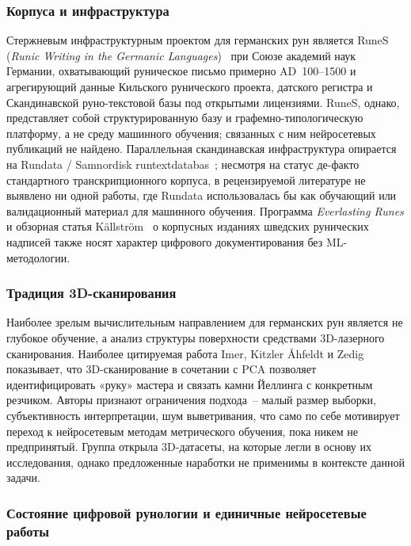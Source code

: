 \documentclass[a4paper,12pt]{extarticle}
\begin{document}
\subsubsection{Корпуса и инфраструктура}

Стержневым инфраструктурным проектом для германских рун является RuneS (\textit{Runic Writing in the Germanic Languages})~\cite{runesdb} при Союзе академий наук Германии, охватывающий руническое письмо примерно AD~100--1500 и агрегирующий данные Кильского рунического проекта, датского регистра и Скандинавской руно-текстовой базы под открытыми лицензиями. RuneS, однако, представляет собой структурированную базу и графемно-типологическую платформу, а не среду машинного обучения; связанных с ним нейросетевых публикаций не найдено. Параллельная скандинавская инфраструктура опирается на Rundata / Samnordisk runtextdatabas~\cite{bianchi_rundata}; несмотря на статус де-факто стандартного транскрипционного корпуса, в рецензируемой литературе не выявлено ни одной работы, где Rundata использовалась бы как обучающий или валидационный материал для машинного обучения. Программа \textit{Everlasting Runes} и обзорная статья Källström~\cite{kallstrom2022} о корпусных изданиях шведских рунических надписей также носят характер цифрового документирования без ML-методологии.

\subsubsection{Традиция 3D-сканирования}

Наиболее зрелым вычислительным направлением для германских рун является не глубокое обучение, а анализ структуры поверхности средствами 3D-лазерного сканирования. Наиболее цитируемая работа Imer, Kitzler Åhfeldt и Zedig~\cite{imer2023} показывает, что 3D-сканирование в сочетании с PCA позволяет идентифицировать «руку» мастера и связать камни Йеллинга с конкретным резчиком. Авторы признают ограничения подхода~-- малый размер выборки, субъективность интерпретации, шум выветривания, что само по себе мотивирует переход к нейросетевым методам метрического обучения, пока никем не предпринятый. Группа открыла 3D-датасеты, на которые легли в основу их исследования, однако предложенные наработки не применимы в контексте данной задачи.

\subsubsection{Состояние цифровой рунологии и единичные нейросетевые работы}
\end{document}
